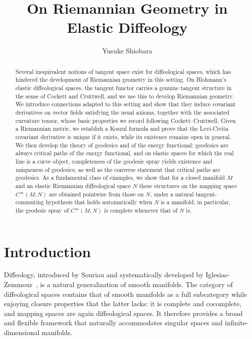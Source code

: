 \documentclass{amsart}
\title{On Riemannian Geometry in Elastic Diffeology}
\author[Y. Shiobara]{Yusuke Shiobara}
\theoremstyle{definition}
\begin{document}
\begin{abstract}
  Several inequivalent notions of tangent space exist for diffeological spaces, which has hindered the development of Riemannian geometry in this setting. 
  On Blohmann's elastic diffeological spaces, the tangent functor carries a genuine tangent structure in the sense of Cockett and Cruttwell, and we use this to develop Riemannian geometry.
  We introduce connections adapted to this setting and show that they induce covariant derivatives on vector fields satisfying the usual axioms, together with the associated curvature tensor, whose basic properties we record following Cockett--Cruttwell. Given a Riemannian metric, we establish a Koszul formula and prove that the Levi-Civita covariant derivative is unique if it exists, while its existence remains open in general.
  We then develop the theory of geodesics and of the energy functional: geodesics are always critical paths of the energy functional, and on elastic spaces for which the real line is a curve object,  completeness of the geodesic spray yields existence and uniqueness of geodesics, as well as the converse statement that critical paths are geodesics. 
  As a fundamental class of examples, we show that for a closed manifold $M$ and an elastic Riemannian diffeological space $N$ these structures on the mapping space $C^\infty(M,N)$ are
  obtained pointwise from those on $N$, under a natural tangent-commuting hypothesis that holds automatically when $N$ is a manifold; in particular, the geodesic spray of $C^\infty(M,N)$ is complete whenever that of $N$ is.
\end{abstract}
\maketitle

\section{Introduction}\label{sec:intro}

Diffeology, introduced by Souriau and systematically developed by Iglesias-Zemmour~\cite{PIZ12}, is a natural generalization of smooth manifolds. The category of diffeological spaces contains that of smooth manifolds as a full subcategory while enjoying closure properties that the latter lacks: it is complete and cocomplete, and mapping spaces are again diffeological spaces. It therefore provides a broad and flexible framework that naturally accommodates singular spaces and infinite-dimensional manifolds.
\end{document}
